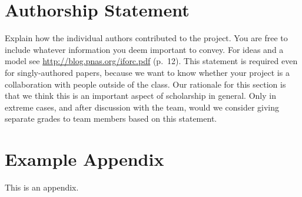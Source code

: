 \documentclass[10pt]{article}
\begin{document}
\section*{Authorship Statement}

Explain how the individual authors contributed to the
project. You are free to include whatever information you deem important to convey. For ideas and a model see \url{http://blog.pnas.org/iforc.pdf} (p.~12).
This statement is required even for singly-authored papers, because we want to know whether your project is a collaboration with people outside of the class. Our rationale for this section is that we think this is an important aspect of scholarship in general. Only in extreme cases, and after discussion with the team, would we consider giving separate grades to team members based on this statement.



\appendix

\section{Example Appendix}\label{sec:appendix}

This is an appendix.
\end{document}
